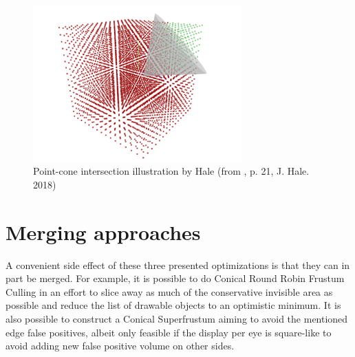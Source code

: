 \begin{figure}[h!]
  \centering
  \includegraphics[height=6cm]{pictures/hale_cone}
  \caption{Point-cone intersection illustration by Hale (from \cite{Hale.2018}, p. 21, J. Hale. 2018)} \label{fig:hale_cone}
\end{figure}

\section{Merging approaches}
A convenient side effect of these three presented optimizations is that they can in part be merged. For example, it is possible to do Conical Round Robin Frustum Culling in an effort to slice away as much of the conservative invisible area as possible and reduce the list of drawable objects to an optimistic minimum. It is also possible to construct a Conical Superfrustum aiming to avoid the mentioned edge false positives, albeit only feasible if the display per eye is square-like to avoid adding new false positive volume on other sides.
